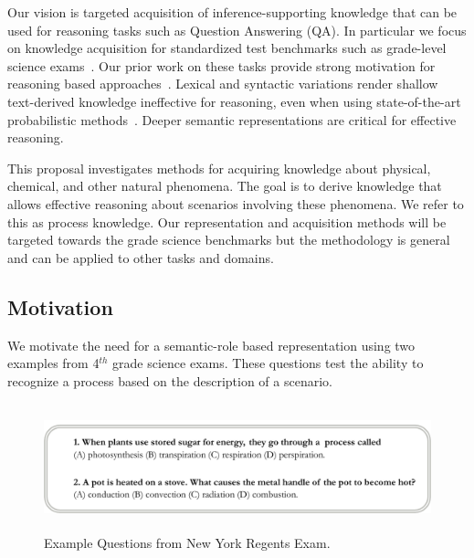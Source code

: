 Our vision is targeted acquisition of inference-supporting knowledge that can be used for reasoning tasks such as Question Answering (QA).
In particular we focus on knowledge acquisition for standardized test benchmarks such as grade-level science exams~\cite{clark2015elementary}.  Our prior work on these tasks provide strong motivation for reasoning based approaches~\cite{clark2014:akbc,chb2013:akbc}.
Lexical and syntactic variations render shallow text-derived knowledge ineffective for reasoning, even when using state-of-the-art probabilistic methods~\cite{khot2015:emlnlp}. 
Deeper semantic representations are critical for effective reasoning.

This proposal investigates methods for acquiring knowledge about physical, chemical, and other natural phenomena.
The goal is to derive knowledge that allows effective reasoning about scenarios involving these phenomena. We refer to this as process knowledge. 
Our representation and acquisition methods will be targeted towards the grade science benchmarks but the methodology is general and can be applied to other tasks and domains.

\subsection{Motivation}
We motivate the need for a semantic-role based representation using two examples from 4$^{th}$ grade science exams. These questions test the ability to recognize a process based on the description of a scenario. \\

\begin{figure}[hbt]
	\begin{center}
	\vspace{-1em}
	\includegraphics[width=6.04in,height=1.45in]{figures/questions-stretch.pdf} 	
	\caption{\label{fig:questions} {Example Questions from New York Regents Exam.}}
	\end{center}
\end{figure}

